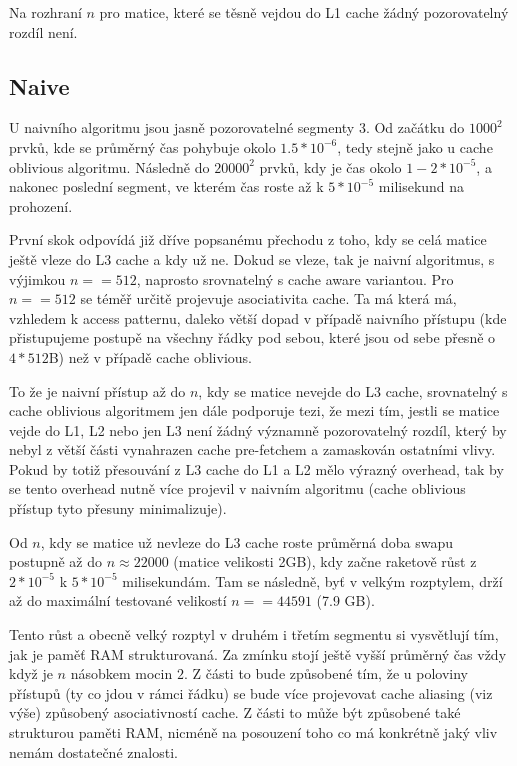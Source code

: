 \documentclass[12pt,a4paper]{report}
\begin{document}
	Na rozhraní $n$ pro matice, které se těsně vejdou do L1 cache žádný pozorovatelný rozdíl není. 
			
	\subsection{Naive}
	U naivního algoritmu jsou jasně pozorovatelné segmenty 3. Od začátku do $1000^2$ prvků, kde se průměrný čas pohybuje okolo $1.5 * 10^{-6}$, tedy stejně jako u cache oblivious algoritmu. Následně do 	$20 000^2$ prvků, kdy je čas okolo $1-2 * 10^{-5}$, a nakonec poslední segment, ve kterém čas roste až k $5*10^{-5}$ milisekund na prohození.
	
	
	První skok odpovídá již dříve popsanému přechodu z toho, kdy se celá matice ještě vleze do L3 cache a kdy už ne. Dokud se vleze, tak je naivní algoritmus, s výjimkou $n == 512$, naprosto srovnatelný s cache aware variantou. Pro $n == 512$ se téměř určitě projevuje asociativita cache. Ta má která má, vzhledem k access patternu, daleko větší dopad v případě naivního přístupu (kde přistupujeme postupě na všechny řádky pod sebou, které jsou od sebe přesně o $4*512$B) než v případě cache oblivious.
	
	To že je naivní přístup až do $n$, kdy se matice nevejde do L3 cache, srovnatelný s cache oblivious algoritmem jen dále podporuje tezi, že mezi tím, jestli se matice vejde do L1, L2 nebo jen L3 není žádný významně pozorovatelný rozdíl, který by nebyl z větší části vynahrazen cache pre-fetchem a zamaskován ostatními vlivy. Pokud by totiž přesouvání z L3 cache do L1 a L2 mělo výrazný overhead, tak by se tento overhead nutně více projevil v naivním algoritmu (cache oblivious přístup tyto přesuny minimalizuje).
	
	Od $n$, kdy se matice už nevleze do L3 cache roste průměrná doba swapu postupně až do $n \approx 22 000$ (matice velikosti 2GB), kdy začne raketově růst z $2 * 10^{-5}$ k $5 * 10^{-5}$ milisekundám. Tam se následně, byť v velkým rozptylem, drží až do maximální testované velikostí $n == 44591$ (7.9 GB).
	
	Tento růst a obecně velký rozptyl v druhém i třetím segmentu si vysvětlují tím, jak je paměť RAM strukturovaná. Za zmínku stojí ještě vyšší průměrný čas vždy když je $n$ násobkem mocin $2$. Z části to bude způsobené tím, že u poloviny přístupů (ty co jdou v rámci řádku) se bude více projevovat cache aliasing (viz výše) způsobený asociativností cache. Z části to může být způsobené také strukturou paměti RAM, nicméně na posouzení toho co má konkrétně jaký vliv nemám dostatečné znalosti.
	
\end{document}
